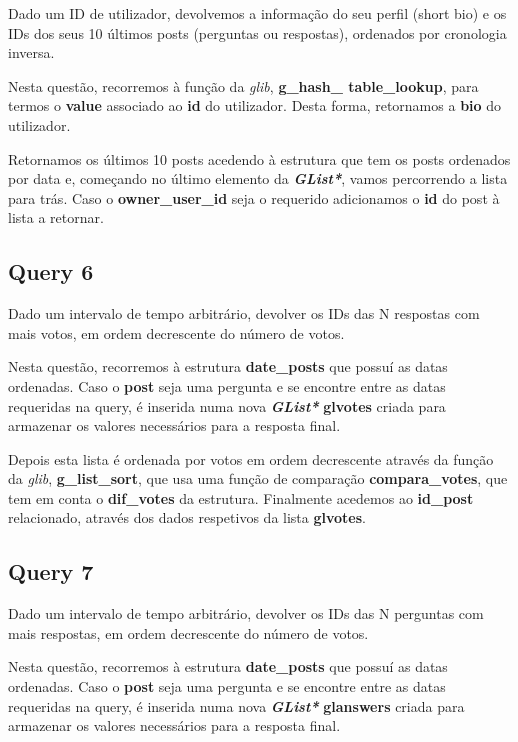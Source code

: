 \documentclass[a4paper]{article}
\begin{document}
Dado um ID de utilizador, devolvemos a informação do seu perfil (short 
bio) e os IDs dos seus 10 últimos posts (perguntas ou respostas), 
ordenados por cronologia inversa.

Nesta questão, recorremos à função da \textit{glib}, \textbf{g\_hash\_
table\_lookup}, para termos o \textbf{value} associado ao \textbf{id}
do utilizador. Desta forma, retornamos a \textbf{bio} do utilizador.

Retornamos os últimos 10 posts acedendo à estrutura que tem os posts
ordenados por data e, começando no último elemento da \textit{
\textbf{GList*}}, vamos percorrendo a lista para trás. Caso o \textbf{
owner\_user\_id} seja o requerido adicionamos o \textbf{id} do post à 
lista a retornar.

\subsection{Query 6}

Dado um intervalo de tempo arbitrário, devolver os IDs das N respostas 
com mais votos, em ordem decrescente do número de votos.

Nesta questão, recorremos à estrutura \textbf{date\_posts} que possuí 
as datas ordenadas. Caso o \textbf{post} seja uma pergunta e
se encontre entre as datas requeridas na query, é inserida numa nova
\textit{\textbf{GList*}} \textbf{glvotes} criada para armazenar os 
valores necessários para a resposta final.

Depois esta lista é ordenada por votos em ordem decrescente através da 
função da \textit{glib}, \textbf{g\_list\_sort}, que usa uma função de 
comparação \textbf{compara\_votes}, que tem em conta o \textbf{dif\_votes}
da estrutura. Finalmente acedemos ao \textbf{id\_post} relacionado, 
através dos dados respetivos da lista \textbf{glvotes}.

\subsection{Query 7}

Dado um intervalo de tempo arbitrário, devolver os IDs das N perguntas 
com mais respostas, em ordem decrescente do número de votos.

Nesta questão, recorremos à estrutura \textbf{date\_posts} que possuí 
as datas ordenadas. Caso o \textbf{post} seja uma pergunta e
se encontre entre as datas requeridas na query, é inserida numa nova
\textit{\textbf{GList*}} \textbf{glanswers} criada para armazenar os 
valores necessários para a resposta final.
\end{document}
